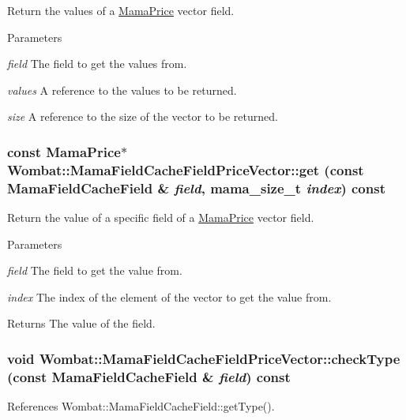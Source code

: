 Return the values of a \hyperlink{classWombat_1_1MamaPrice}{MamaPrice} vector field. 
\begin{DoxyParams}{Parameters}
\item[{\em field}]The field to get the values from. \item[{\em values}]A reference to the values to be returned. \item[{\em size}]A reference to the size of the vector to be returned. \end{DoxyParams}
\hypertarget{classWombat_1_1MamaFieldCacheFieldPriceVector_a1bc34920cd888b55c341cb650e86e510}{
\subsubsection[{get}]{\setlength{\rightskip}{0pt plus 5cm}const {\bf MamaPrice}$\ast$ Wombat::MamaFieldCacheFieldPriceVector::get (const {\bf MamaFieldCacheField} \& {\em field}, \/  {\bf mama\_\-size\_\-t} {\em index}) const}}
\label{classWombat_1_1MamaFieldCacheFieldPriceVector_a1bc34920cd888b55c341cb650e86e510}


Return the value of a specific field of a \hyperlink{classWombat_1_1MamaPrice}{MamaPrice} vector field. 
\begin{DoxyParams}{Parameters}
\item[{\em field}]The field to get the value from. \item[{\em index}]The index of the element of the vector to get the value from. \end{DoxyParams}
\begin{DoxyReturn}{Returns}
The value of the field. 
\end{DoxyReturn}
\hypertarget{classWombat_1_1MamaFieldCacheFieldPriceVector_aa6144ba25d0518d127aadfb75ab97182}{
\subsubsection[{checkType}]{\setlength{\rightskip}{0pt plus 5cm}void Wombat::MamaFieldCacheFieldPriceVector::checkType (const {\bf MamaFieldCacheField} \& {\em field}) const}}
\label{classWombat_1_1MamaFieldCacheFieldPriceVector_aa6144ba25d0518d127aadfb75ab97182}


References Wombat::MamaFieldCacheField::getType().